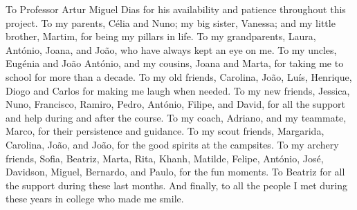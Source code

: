 
%

\begin{ntacknowledgements}

To Professor Artur Miguel Dias for his availability and patience throughout this project. 
To my parents, Célia and Nuno; my big sister, Vanessa; and my little brother, Martim, for being my pillars in life.
To my grandparents, Laura, António, Joana, and João, who have always kept an eye on me.
To my uncles, Eugénia and João António, and my cousins, Joana and Marta, for taking me to school for more than a decade.
To my old friends, Carolina, João, Luís, Henrique, Diogo and Carlos for making me laugh when needed.
To my new friends, Jessica, Nuno, Francisco, Ramiro, Pedro, António, Filipe, and David, for all the support and help during and after the course.
To my coach, Adriano, and my teammate, Marco, for their persistence and guidance.
To my scout friends, Margarida, Carolina, João, and João, for the good spirits at the campsites.
To my archery friends, Sofia, Beatriz, Marta, Rita, Khanh, Matilde, Felipe, António, José, Davidson, Miguel, Bernardo, and Paulo, for the fun moments.
To Beatriz for all the support during these last months.
And finally, to all the people I met during these years in college who made me smile.

\end{ntacknowledgements} 